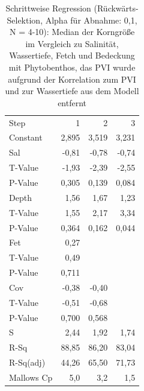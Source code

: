 \begin{table}[!htb]
\centering
\caption[Schrittweise Regression: Organischer Gehalt der Sedimente im Vergleich zu 4 Prädikatoren]{Schrittweise Regression (Rückwärts-Selektion, Alpha für Abnahme: 0,1, N = 4-10): Median der Korngröße im Vergleich zu Salinität, Wassertiefe, Fetch und Bedeckung mit Phytobenthos, das PVI  wurde aufgrund der Korrelation zum PVI und zur Wassertiefe aus dem Modell entfernt}
\begin{tabular}{lrrr}
\toprule
Step      	&     1  &    2     & 		3\\
Constant   	& 2,895  &	3,519  	&	3,231\\
\midrule
Sal         & -0,81  &	-0,78  	&	-0,74\\
T-Value     & -1,93  &	-2,39  	&	-2,55\\
P-Value     & 0,305  &	0,139  	&	0,084\\
\midrule
Depth       & 1,56   &	1,67   	&	1,23\\
T-Value     & 1,55   &	2,17   	&	3,34\\
P-Value     &0,364  &	0,162  	&	0,044\\
\midrule
Fet       &   0,27\\
T-Value    &  0,49\\
P-Value    & 0,711\\
\midrule
Cov      &   -0,38  &	-0,40\\
T-Value   &  -0,51  &	-0,68\\
P-Value   &  0,700  &	0,568\\
\midrule
\midrule
S        &    2,44   &	1,92   	&	1,74\\
R-Sq      &  88,85  &	86,20  	&	83,04\\
R-Sq(adj) &  44,26  &	65,50  	&	71,73\\
Mallows Cp  &  5,0  &  	3,2    	&	1,5 \\
\bottomrule
\end{tabular}
\label{tab:spearman_rank_correlations}
\end{table}








   